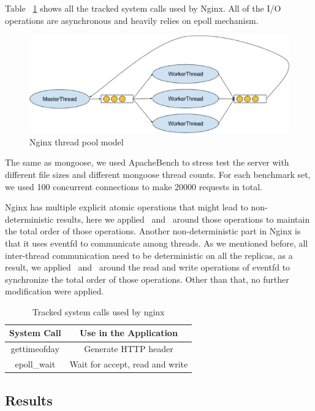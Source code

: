 Table ~\ref{t:nginx_syscall} shows all the tracked system calls used by Nginx. All of the I/O operations are asynchronous and heavily relies on epoll mechanism. 

\begin{figure}
\centering
\includegraphics[width=0.8\columnwidth]{figures/nginx_model}
\caption{Nginx thread pool model}
\label{f:nginx_model}
\end{figure}

The same as mongoose, we used ApacheBench to stress test the server with different file sizes and different mongoose thread counts. For each benchmark set, we used 100 concurrent connections to make 20000 requests in total.

Nginx has multiple explicit atomic operations that might lead to non-deterministic results, here we applied \detstart\ and \detend\ around those operations to maintain the total order of those operations. Another non-deterministic part in Nginx is that it uses eventfd to communicate among threads. As we mentioned before, all inter-thread communication need to be deterministic on all the replicas, as a result, we applied \detstart\ and \detend\ around the read and write operations of eventfd to synchronize the total order of those operations. Other than that, no further modification were applied.

\begin{table}
\caption{Tracked system calls used by nginx}
\begin{center}
 \begin{tabular}{c | c }
System Call & Use in the Application\\ \hline
 gettimeofday & Generate HTTP header\\ \hline
 epoll\_wait & Wait for accept, read and write
 \end{tabular}
\end{center}
\label{t:nginx_syscall}
\end{table}

\subsection{Results}

